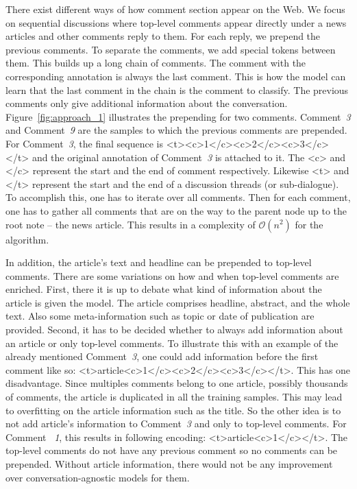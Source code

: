 There exist different ways of how comment section appear on the Web.
We focus on sequential discussions where top-level comments appear directly under a news articles and other comments reply to them.
For each reply, we prepend the previous comments.
To separate the comments, we add special tokens between them.
This builds up a long chain of comments.
The comment with the corresponding annotation is always the last comment.
This is how the model can learn that the last comment in the chain is the comment to classify.
The previous comments only give additional information about the conversation.
Figure~\ref{fig:approach_1} illustrates the prepending for two comments. Comment~\textit{3} and Comment~\textit{9} are the samples to which the previous comments are prepended.
For Comment~\textit{3}, the final sequence is <t><c>1</c><c>2</c><c>3</c></t> and the original annotation of Comment~\textit{3} is attached to it.
The <c> and </c> represent the start and the end of comment respectively. Likewise <t> and </t> represent the start and the end of a discussion threads (or sub-dialogue).
To accomplish this, one has to iterate over all comments. %
Then for each comment, one has to gather all comments that are on the way to the parent node up to the root note -- the news article. %
This results in a complexity of $\mathcal{O}(n^2)$ for the algorithm.%

\newpage
In addition, the article's text and headline can be prepended to top-level comments.
There are some variations on how and when top-level comments are enriched.
First, there it is up to debate what kind of information about the article is given the model.
The article comprises headline, abstract, and the whole text.
Also some meta-information such as topic or date of publication are provided.
Second, it has to be decided whether to always add information about an article or only top-level comments.
To illustrate this with an example of the already mentioned Comment~\textit{3}, one could add information before the first comment like so: <t>article<c>1</c><c>2</c><c>3</c></t>.
This has one disadvantage.
Since multiples comments belong to one article, possibly thousands of comments, the article is duplicated in all the training samples.
This may lead to overfitting on the article information such as the title.
So the other idea is to not add article's information to Comment~\textit{3} and only to top-level comments.
For Comment ~\textit{1}, this results in following encoding: <t>article<c>1</c></t>.
The top-level comments do not have any previous comment so no comments can be prepended.
Without article information, there would not be any improvement over conversation-agnostic models for them.

